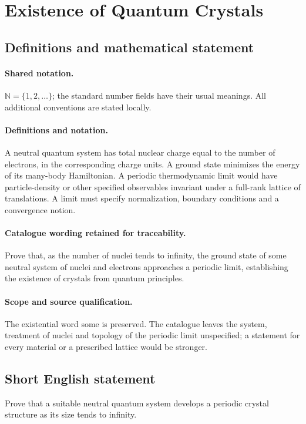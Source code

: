 \documentclass[11pt]{article}
\begin{document}
\section{Existence of Quantum Crystals}\label{statement}

\subsection{Definitions and mathematical statement}

\paragraph{Shared notation.}$\mathbb N=\{1,2,\ldots\}$; the standard number fields have their usual meanings. All additional conventions are stated locally.


\paragraph{Definitions and notation.}A neutral quantum system has total nuclear charge equal to the number of electrons, in the corresponding charge units. A ground state minimizes the energy of its many-body Hamiltonian. A periodic thermodynamic limit would have particle-density or other specified observables invariant under a full-rank lattice of translations. A limit must specify normalization, boundary conditions and a convergence notion.

\paragraph{Catalogue wording retained for traceability.}
Prove that, as the number of nuclei tends to infinity, the ground state of some neutral system of nuclei and electrons approaches a periodic limit, establishing the existence of crystals from quantum principles.
\paragraph{Scope and source qualification.}The existential word some is preserved. The catalogue leaves the system, treatment of nuclei and topology of the periodic limit unspecified; a statement for every material or a prescribed lattice would be stronger.
\subsection{Short English statement}
Prove that a suitable neutral quantum system develops a periodic crystal structure as its size tends to infinity.
\end{document}
